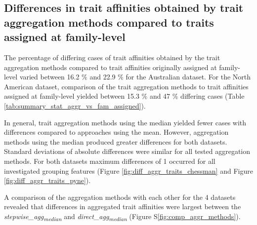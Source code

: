 \documentclass[../Draft_harmonization_paper.tex]{subfiles}
\begin{document}
\subsection*{Differences in trait affinities obtained by trait aggregation methods compared to traits assigned at family-level}
\label{sec:diff_trait_agg_chessman}

The percentage of differing cases of trait affinities obtained by the trait aggregation methods compared to trait affinities originally assigned at family-level varied between 16.2 \% and 22.9 \% for the Australian dataset. For the North American dataset, comparison of the trait aggregation methods to trait affinities assigned at family-level yielded between 15.3 \% and 47 \% differing cases (Table \ref{tab:summary_stat_aggr_vs_fam_assigned}).

In general, trait aggregation methods using the median yielded fewer cases with differences compared to approaches using the mean. However, aggregation methods using the median produced greater differences for both datasets. Standard deviations of absolute differences were similar for all tested aggregation methods. For both datasets maximum differences of 1 occurred for all investigated grouping features (Figure \ref{fig:diff_aggr_traits_chessman} and Figure \ref{fig:diff_aggr_traits_pyne}).

A comparison of the aggregation methods with each other for the 4 datasets revealed that differences in aggregated trait affinities were largest between the \textit{stepwise\_agg\textsubscript{median}} and \textit{direct\_agg\textsubscript{median}} (Figure S\ref{fig:comp_aggr_methods}).
\end{document}
